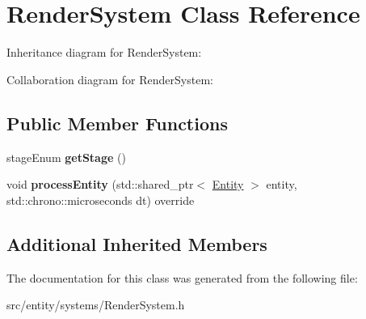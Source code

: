 \hypertarget{classRenderSystem}{\section{Render\-System Class Reference}
\label{classRenderSystem}
}


Inheritance diagram for Render\-System\-:


Collaboration diagram for Render\-System\-:
\subsection*{Public Member Functions}
\begin{DoxyCompactItemize}
\item 
\hypertarget{classRenderSystem_a480dc6277193c0b252b8d3ceba537a52}{stage\-Enum {\bfseries get\-Stage} ()}\label{classRenderSystem_a480dc6277193c0b252b8d3ceba537a52}

\item 
\hypertarget{classRenderSystem_a19db251b0a94bcab13e79d5cb5d2afbf}{void {\bfseries process\-Entity} (std\-::shared\-\_\-ptr$<$ \hyperlink{classEntity}{Entity} $>$ entity, std\-::chrono\-::microseconds dt) override}\label{classRenderSystem_a19db251b0a94bcab13e79d5cb5d2afbf}

\end{DoxyCompactItemize}
\subsection*{Additional Inherited Members}


The documentation for this class was generated from the following file\-:\begin{DoxyCompactItemize}
\item 
src/entity/systems/Render\-System.\-h\end{DoxyCompactItemize}
